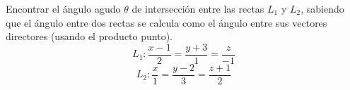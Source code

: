 Encontrar el ángulo agudo $\theta$ de intersección entre las rectas $L_1$ y $L_2$, sabiendo que el ángulo entre dos rectas se calcula como el ángulo entre sus vectores directores (usando el producto punto).
\[ L_1: \frac{x-1}{2} = \frac{y+3}{1} = \frac{z}{-1} \]
\[ L_2: \frac{x}{1} = \frac{y-2}{3} = \frac{z+1}{2} \]